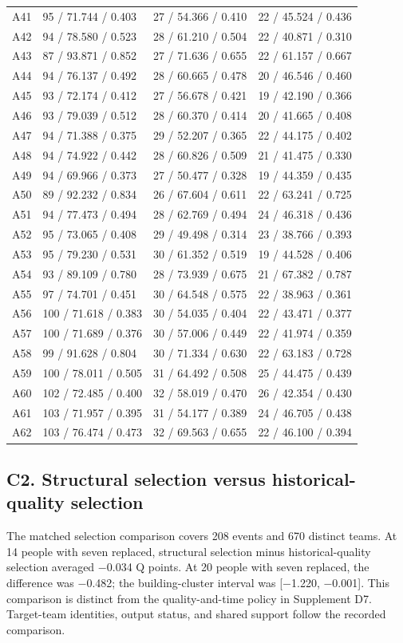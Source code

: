 \documentclass[10pt]{article}
\begin{document}
\begin{longtable}{llll}
A41 & 95 / 71.744 / 0.403 & 27 / 54.366 / 0.410 & 22 / 45.524 / 0.436 \\
A42 & 94 / 78.580 / 0.523 & 28 / 61.210 / 0.504 & 22 / 40.871 / 0.310 \\
A43 & 87 / 93.871 / 0.852 & 27 / 71.636 / 0.655 & 22 / 61.157 / 0.667 \\
A44 & 94 / 76.137 / 0.492 & 28 / 60.665 / 0.478 & 20 / 46.546 / 0.460 \\
A45 & 93 / 72.174 / 0.412 & 27 / 56.678 / 0.421 & 19 / 42.190 / 0.366 \\
A46 & 93 / 79.039 / 0.512 & 28 / 60.370 / 0.414 & 20 / 41.665 / 0.408 \\
A47 & 94 / 71.388 / 0.375 & 29 / 52.207 / 0.365 & 22 / 44.175 / 0.402 \\
A48 & 94 / 74.922 / 0.442 & 28 / 60.826 / 0.509 & 21 / 41.475 / 0.330 \\
A49 & 94 / 69.966 / 0.373 & 27 / 50.477 / 0.328 & 19 / 44.359 / 0.435 \\
A50 & 89 / 92.232 / 0.834 & 26 / 67.604 / 0.611 & 22 / 63.241 / 0.725 \\
A51 & 94 / 77.473 / 0.494 & 28 / 62.769 / 0.494 & 24 / 46.318 / 0.436 \\
A52 & 95 / 73.065 / 0.408 & 29 / 49.498 / 0.314 & 23 / 38.766 / 0.393 \\
A53 & 95 / 79.230 / 0.531 & 30 / 61.352 / 0.519 & 19 / 44.528 / 0.406 \\
A54 & 93 / 89.109 / 0.780 & 28 / 73.939 / 0.675 & 21 / 67.382 / 0.787 \\
A55 & 97 / 74.701 / 0.451 & 30 / 64.548 / 0.575 & 22 / 38.963 / 0.361 \\
A56 & 100 / 71.618 / 0.383 & 30 / 54.035 / 0.404 & 22 / 43.471 / 0.377 \\
A57 & 100 / 71.689 / 0.376 & 30 / 57.006 / 0.449 & 22 / 41.974 / 0.359 \\
A58 & 99 / 91.628 / 0.804 & 30 / 71.334 / 0.630 & 22 / 63.183 / 0.728 \\
A59 & 100 / 78.011 / 0.505 & 31 / 64.492 / 0.508 & 25 / 44.475 / 0.439 \\
A60 & 102 / 72.485 / 0.400 & 32 / 58.019 / 0.470 & 26 / 42.354 / 0.430 \\
A61 & 103 / 71.957 / 0.395 & 31 / 54.177 / 0.389 & 24 / 46.705 / 0.438 \\
A62 & 103 / 76.474 / 0.473 & 32 / 69.563 / 0.655 & 22 / 46.100 / 0.394 \\
\bottomrule\end{longtable}
\subsection*{C2. Structural selection versus historical-quality selection}
The matched selection comparison covers 208 events and 670 distinct teams. At 14 people with seven replaced, structural selection minus historical-quality selection averaged $-$0.034 Q points. At 20 people with seven replaced, the difference was $-$0.482; the building-cluster interval was [$-$1.220, $-$0.001]. This comparison is distinct from the quality-and-time policy in Supplement D7. Target-team identities, output status, and shared support follow the recorded comparison.
\end{document}

